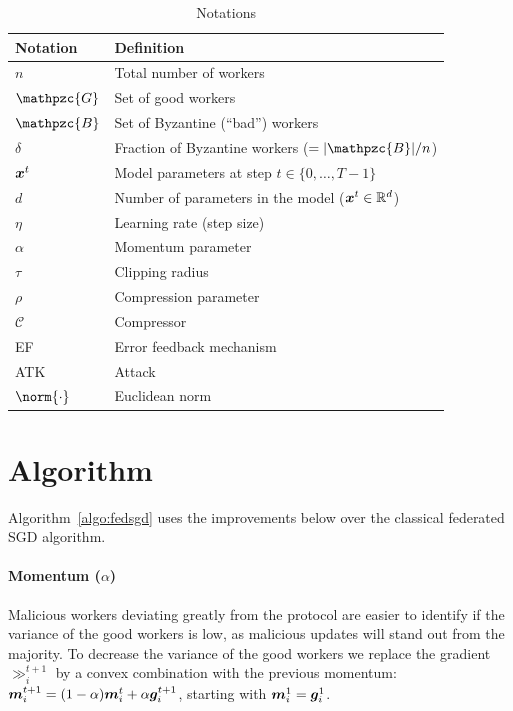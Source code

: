 \documentclass{article}
\newcommand{\gset}{\ensuremath{{\mathpzc{G}}}}
\newcommand{\bset}{\ensuremath{{\mathpzc{B}}}}
\begin{document}
\begin{table}[h]
\caption{Notations}\label{table:notations}
\centering
\begin{tabular}{ll}
\toprule
Notation & Definition \\
\midrule
$n$ & Total number of workers \\
$\gset$ & Set of good workers \\
$\bset$ & Set of Byzantine (``bad'') workers \\
$\delta$ & Fraction of Byzantine workers ($=|\bset|/n$)\\
$\bm{x}^t$ & Model parameters at step $t \in \{0, \ldots, T-1\}$ \\
$d$ & Number of parameters in the model ($\bm{x}^t \in \mathbb R^d$) \\
$\eta$ & Learning rate (step size) \\
$\alpha$ & Momentum parameter \\
$\tau$ & Clipping radius \\
$\rho$ & Compression parameter \\
$\mathcal C$ & Compressor \\
EF & Error feedback mechanism \\
ATK & Attack \\
$\norm{\cdot}$ & Euclidean norm \\
\bottomrule
\end{tabular}
\end{table}


\section{Algorithm}


Algorithm~\ref{algo:fedsgd} uses the improvements below over the classical federated SGD algorithm. 


\paragraph*{Momentum ($\alpha$)} \parencite{LearningFromHistory} Malicious workers deviating greatly from the protocol are easier to identify if the variance of the good workers is low, as malicious updates will stand out from the majority. To decrease the variance of the good workers we replace the gradient $\gg_i^{t+1}$ by a convex combination with the previous momentum: $\bm{m}_i^{t+1} = (1-\alpha) \bm{m}_i^{t} + \alpha \bm{g}_i^{t+1}$, starting with $\bm{m}_i^{1} = \bm{g}_i^1$.
\end{document}
